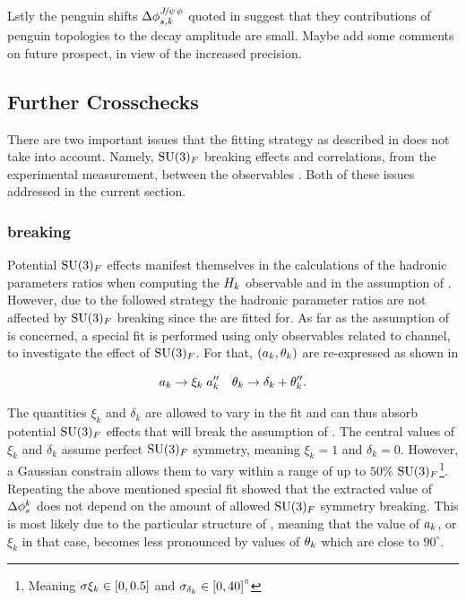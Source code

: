 Lstly the penguin shifts $\Delta\phi^{{J\mskip -3mu/\mskip -2mu\psi\mskip 2mu}\phi}_{s,{k}}$ quoted in 
suggest that they contributions of penguin topologies to the \BsJpsiPhi decay amplitude are small.
{\color{red} Maybe add some comments on future prospect, in view of the increased precision.}

\subsection{Further Crosschecks}
There are two important issues that the fitting strategy as described in 
does not take into account. Namely, $\mathrm{SU}(3)_F$ breaking effects and correlations, from the
experimental measurement, between the observables . Both of these issues
addressed in the current section.

\subsubsection{\grpsuthree breaking}
\label{su3_breaking}
Potential $\mathrm{SU}(3)_F$ effects manifest themselves in the calculations of the hadronic parameters ratios
when computing the $H_{k}$ observable and in the assumption of . However, due to the
followed strategy the hadronic parameter ratios are not affected by $\mathrm{SU}(3)_F$ breaking since the are fitted for.
As far as the assumption of  is concerned, a special fit is performed using only observables
related to \BdJpsiRho channel, to investigate the effect of $\mathrm{SU}(3)_F$. For that, $(a_k,\theta_k)$
are re-expressed as shown in 

\begin{equation}
  \centering
  \akPeng \to \xi_k \; \akPeng'' \quad \thkPeng \to \delta_k + \thkPeng''.
\label{su3_breaking}
\end{equation}

\noindent The quantities $\xi_k$ and $\delta_k$ are allowed to vary in the fit and can thus absorb
potential $\mathrm{SU}(3)_F$ effects that will break the assumption of .
The central values of $\xi_k$ and $\delta_k$ assume perfect $\mathrm{SU}(3)_F$ symmetry, meaning $\xi_k=1$ and $\delta_k=0$.
However, a Gaussian constrain allows them to vary within a range of up to $50\%$
$\mathrm{SU}(3)_F$\footnote{Meaning $\sigma{\xi_k}\in\left[ 0,0.5 \right]$ and $\sigma_{\delta_k}\in\left[ 0,40 \right]^\circ$ }.
Repeating the above mentioned special fit showed that the extracted value of $\Delta\phi_{s}^{k}$
does not depend on the amount of allowed $\mathrm{SU}(3)_F$ symmetry breaking.
This is most likely due to the particular structure of , meaning that
the value of $a_k$, or $\xi_k$ in that case, becomes less pronounced by values of
$\theta_k$ which are close to $90^\circ$.

